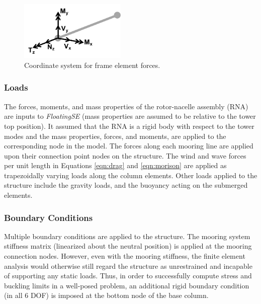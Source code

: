 \begin{figure}[htb]
  \begin{center}
    \includegraphics[width=2in]{figs/frameCS.pdf}
    \caption{Coordinate system for frame element forces.}
    \label{fig:frameCS}
  \end{center}
\end{figure}

\subsubsection{Loads}
The forces, moments, and mass properties of the rotor-nacelle assembly
(RNA) are inputs to \textit{FloatingSE} (mass properties are assumed to
be relative to the tower top position).  It assumed that the RNA is a
rigid body with respect to the tower modes and the mass properties,
forces, and moments, are applied to the corresponding node in the model.
The forces along each mooring line are applied upon their connection
point nodes on the structure.  The wind and wave forces per unit length
in Equations \ref{eqn:drag} and \ref{eqn:morison} are applied as
trapezoidally varying loads along the column elements.  Other loads
applied to the structure include the gravity loads, and the buoyancy
acting on the submerged elements.

\subsubsection{Boundary Conditions}
Multiple boundary conditions are applied to the structure.  The mooring
system stiffness matrix (linearized about the neutral position) is
applied at the mooring connection nodes.  However, even with the mooring
stiffness, the finite element analysis would otherwise still regard the
structure as unrestrained and incapable of supporting any static loads.
Thus, in order to successfully compute stress and buckling limits in a
well-posed problem, an additional rigid boundary condition (in all 6
DOF) is imposed at the bottom node of the base column.

